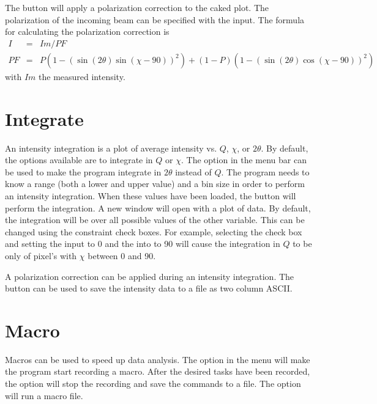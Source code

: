The  button will apply a 
polarization correction to the caked plot. The polarization
of the incoming beam can be specified with the 
 input. The formula for calculating the 
polarization correction is
\begin{eqnarray}
    I&=&Im/PF \\ 
    PF&=&P(1 - (\sin(2\theta)\sin(\chi-90))^2) + 
    (1 - P)(1 - (\sin(2\theta)\cos(\chi-90))^2)
\end{eqnarray}
with $Im$ the measured intensity. 


\section{Integrate}

An intensity integration is a plot of average intensity
vs. $Q$, $\chi$, or $2\theta$. By default, the options 
available are to integrate in $Q$ or $\chi$. The 
 option in the menu bar can be used 
to make the program integrate in $2\theta$ instead of $Q$.  
The program needs to know a range (both a lower and upper value)
and a bin size in order to perform an intensity integration.
When these values have been loaded, the  button will 
perform the integration. A new window will open with a plot of data.
By default, the integration will be over all 
possible values of the other variable. This can be changed using the
constraint check boxes. 
For example, selecting the 
check box and setting the  input to 0 and the
 into to 90 will cause the integration in $Q$
to be only of pixel's with $\chi$ between 0 and 90. 

A polarization correction can be applied during
an intensity integration. The  button can be used
to save the intensity data to a file as two column ASCII. 

\section{Macro}

Macros can be used to speed up data analysis. 
The  option in the  menu
will make the program start recording a macro. After the desired
tasks have been recorded, the  option will
stop the recording and save the commands to a file. The
 option will run a macro file.

